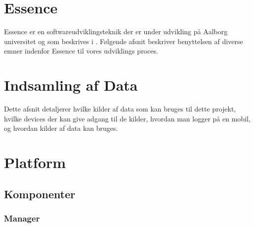 












\chapter{Essence}
Essence er en softwareudviklingsteknik der er under udvikling på Aalborg universitet og som beskrives i \citet{art:essence}.
Følgende afsnit beskriver benyttelsen af diverse emner indenfor Essence til vores udviklings proces.


%



\chapter{Indsamling af Data}
Dette afsnit detaljerer hvilke kilder af data som kan bruges til dette projekt, hvilke devices der kan give adgang til de kilder, hvordan man logger på en mobil, og hvordan kilder af data kan bruges.






\chapter{Platform}





\section{Komponenter}

\subsection{Manager}

